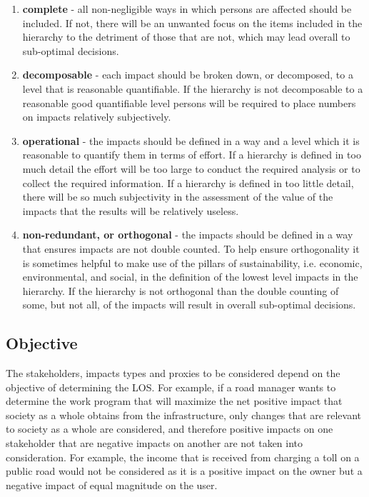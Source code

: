 \begin{enumerate}
\item \textbf{complete} - all non-negligible ways in which persons are affected should be included. If not, there will be an unwanted focus on the items included in the hierarchy to the detriment of those that are not, which may lead overall to sub-optimal decisions.
\item \textbf{decomposable} - each impact should be broken down, or decomposed, to a level that is reasonable quantifiable. If the hierarchy is not decomposable to a reasonable good quantifiable level persons will be required to place numbers on impacts relatively subjectively.  
\item \textbf{operational} - the impacts should be defined in a way and a level which it is reasonable to quantify them in terms of effort. If a hierarchy is defined in too much detail the effort will be too large to conduct the required analysis or to collect the required information. If a hierarchy is defined in too little detail, there will be so much subjectivity in the assessment of the value of the impacts that the results will be relatively useless. 
\item \textbf{non-redundant, or orthogonal} - the impacts should be defined in a way that ensures impacts are not double counted. To help ensure orthogonality it is sometimes helpful to make use of the pillars of sustainability, i.e. economic, environmental, and social, in the definition of the lowest level impacts in the hierarchy. If the hierarchy is not orthogonal than the double counting of some, but not all, of the impacts will result in overall sub-optimal decisions.                                                                                                                                                                                                                                                                                                                                                                                                                                                                                 \end{enumerate}
%
\subsection{Objective}
The stakeholders, impacts types and proxies to be considered depend on the objective of determining the LOS. For example, if a road manager wants to determine the work program that will maximize the net positive impact that society as a whole obtains from the infrastructure, only changes that are relevant to society as a whole are considered, and therefore positive impacts on one stakeholder that are negative impacts on another are not taken into consideration. For example, the income that is received from charging a toll on a public road would not be considered as it is a positive impact on the owner but a negative impact of equal magnitude on the user.
%
